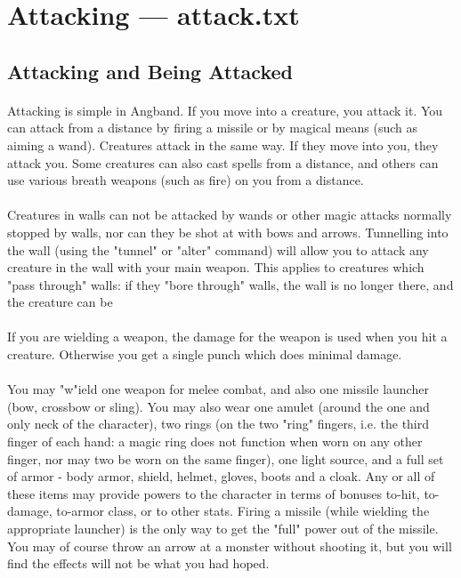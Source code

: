 \section{Attacking --- attack.txt}

\subsection{Attacking and Being Attacked}
\paragraph{}Attacking is simple in Angband. If you move into a creature, you attack it.
You can attack from a distance by firing a missile or by magical means (such
as aiming a wand). Creatures attack in the same way. If they move into you,
they attack you. Some creatures can also cast spells from a distance, and
others can use various breath weapons (such as fire) on you from a distance.

\paragraph{}Creatures in walls can not be attacked by wands or other magic attacks
normally stopped by walls, nor can they be shot at with bows and arrows.
Tunnelling into the wall (using the "tunnel" or "alter" command) will
allow you to attack any creature in the wall with your main weapon.
This applies to creatures which "pass through" walls: if they "bore
through" walls, the wall is no longer there, and the creature can be

\paragraph{}If you are wielding a weapon, the damage for the weapon is used when you hit
a creature. Otherwise you get a single punch which does minimal damage.

\paragraph{}You may "w"ield one weapon for melee combat, and also one missile launcher
(bow, crossbow or sling). You may also wear one amulet (around the one and
only neck of the character), two rings (on the two "ring" fingers, i.e. the
third finger of each hand: a magic ring does not function when worn on any
other finger, nor may two be worn on the same finger), one light source,
and a full set of armor - body armor, shield, helmet, gloves, boots and
a cloak. Any or all of these items may provide powers to the character
in terms of bonuses to-hit, to-damage, to-armor class, or to other
stats.  Firing a missile (while wielding the appropriate launcher) is
the only way to get the "full" power out of the missile. You may of
course throw an arrow at a monster without shooting it, but you will
find the effects will not be what you had hoped.

